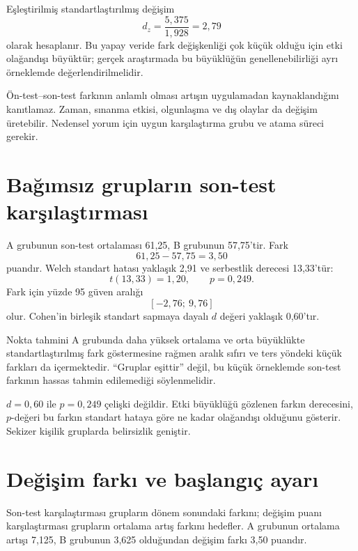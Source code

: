 Eşleştirilmiş standartlaştırılmış değişim
\[
d_z=\frac{5{,}375}{1{,}928}=2{,}79
\]
olarak hesaplanır. Bu yapay veride fark değişkenliği çok küçük olduğu için
etki olağandışı büyüktür; gerçek araştırmada bu büyüklüğün genellenebilirliği
ayrı örneklemde değerlendirilmelidir.

\begin{mistakebox}
Ön-test--son-test farkının anlamlı olması artışın uygulamadan kaynaklandığını
kanıtlamaz. Zaman, sınanma etkisi, olgunlaşma ve dış olaylar da değişim
üretebilir. Nedensel yorum için uygun karşılaştırma grubu ve atama süreci
gerekir.
\end{mistakebox}

\section{Bağımsız grupların son-test karşılaştırması}

A grubunun son-test ortalaması 61,25, B grubunun 57,75'tir. Fark
\[
61{,}25-57{,}75=3{,}50
\]
puandır. Welch standart hatası yaklaşık 2,91 ve serbestlik derecesi 13,33'tür:
\[
t(13{,}33)=1{,}20,
\qquad p=0{,}249.
\]
Fark için yüzde 95 güven aralığı
\[
[-2{,}76;\ 9{,}76]
\]
olur. Cohen'in birleşik standart sapmaya dayalı $d$ değeri yaklaşık 0,60'tır.

Nokta tahmini A grubunda daha yüksek ortalama ve orta büyüklükte
standartlaştırılmış fark göstermesine rağmen aralık sıfırı ve ters yöndeki
küçük farkları da içermektedir. ``Gruplar eşittir'' değil, bu küçük örneklemde
son-test farkının hassas tahmin edilemediği söylenmelidir.

\begin{researchbox}
$d=0{,}60$ ile $p=0{,}249$ çelişki değildir. Etki büyüklüğü gözlenen farkın
derecesini, $p$-değeri bu farkın standart hataya göre ne kadar olağandışı
olduğunu gösterir. Sekizer kişilik gruplarda belirsizlik geniştir.
\end{researchbox}

\section{Değişim farkı ve başlangıç ayarı}

Son-test karşılaştırması grupların dönem sonundaki farkını; değişim puanı
karşılaştırması grupların ortalama artış farkını hedefler. A grubunun ortalama
artışı 7,125, B grubunun 3,625 olduğundan değişim farkı 3,50 puandır.

